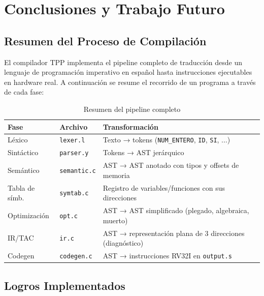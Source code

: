 \chapter{Conclusiones y Trabajo Futuro}

\section{Resumen del Proceso de Compilación}

El compilador TPP implementa el pipeline completo de traducción desde un lenguaje de programación imperativo en español hasta instrucciones ejecutables en hardware real. A continuación se resume el recorrido de un programa a través de cada fase:

\begin{table}[H]
\centering
\begin{tabular}{p{2.5cm}p{3.5cm}p{7cm}}
\toprule
\textbf{Fase} & \textbf{Archivo} & \textbf{Transformación} \\
\midrule
Léxico & \texttt{lexer.l} & Texto → tokens (\texttt{NUM\_ENTERO}, \texttt{ID}, \texttt{SI}, ...) \\
Sintáctico & \texttt{parser.y} & Tokens → AST jerárquico \\
Semántico & \texttt{semantic.c} & AST → AST anotado con tipos y offsets de memoria \\
Tabla de símb. & \texttt{symtab.c} & Registro de variables/funciones con sus direcciones \\
Optimización & \texttt{opt.c} & AST → AST simplificado (plegado, algebraica, muerto) \\
IR/TAC & \texttt{ir.c} & AST → representación plana de 3 direcciones (diagnóstico) \\
Codegen & \texttt{codegen.c} & AST → instrucciones RV32I en \texttt{output.s} \\
\bottomrule
\end{tabular}
\caption{Resumen del pipeline completo}
\label{tab:resumen}
\end{table}

\section{Logros Implementados}

